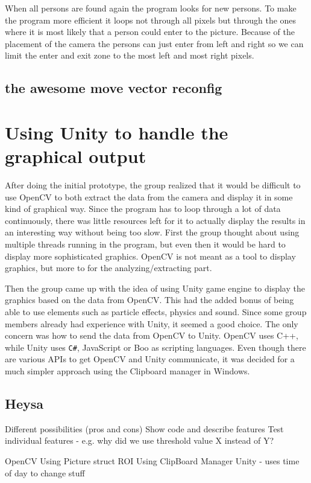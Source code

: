 When all persons are found again the program looks for new persons. To make the program more efficient it loops not through all pixels but through the ones where it is most likely that a person could enter to the picture. Because of the placement of the camera the persons can just enter from left and right so we can limit the enter and exit zone to the most left and most right pixels. 

\subsection{the awesome move vector reconfig}

\section{Using Unity to handle the graphical output}
After doing the initial prototype, the group realized that it would be difficult to use OpenCV to both extract the data from the camera and display it in some kind of graphical way. Since the program has to loop through a lot of data continuously, there was little resources left for it to actually display the results in an interesting way without being too slow. First the group thought about using multiple threads running in the program, but even then it would be hard to display more sophisticated graphics. OpenCV is not meant as a tool to display graphics, but more to for the analyzing/extracting part.

Then the group came up with the idea of using Unity game engine to display the graphics based on the data from OpenCV. This had the added bonus of being able to use elements such as particle effects, physics and sound. Since some group members already had experience with Unity, it seemed a good choice. The only concern was how to send the data from OpenCV to Unity. OpenCV uses C++, while Unity uses \texttt{C\#}, JavaScript or Boo as scripting languages. Even though there are various APIs to get OpenCV and Unity communicate, it was decided for a much simpler approach using the Clipboard manager in Windows.

\subsection{Heysa}
Different possibilities (pros and cons)
Show code and describe features
Test individual features - e.g. why did we use threshold value X instead of Y?

OpenCV
Using Picture struct
ROI
Using ClipBoard Manager
Unity - uses time of day to change stuff

